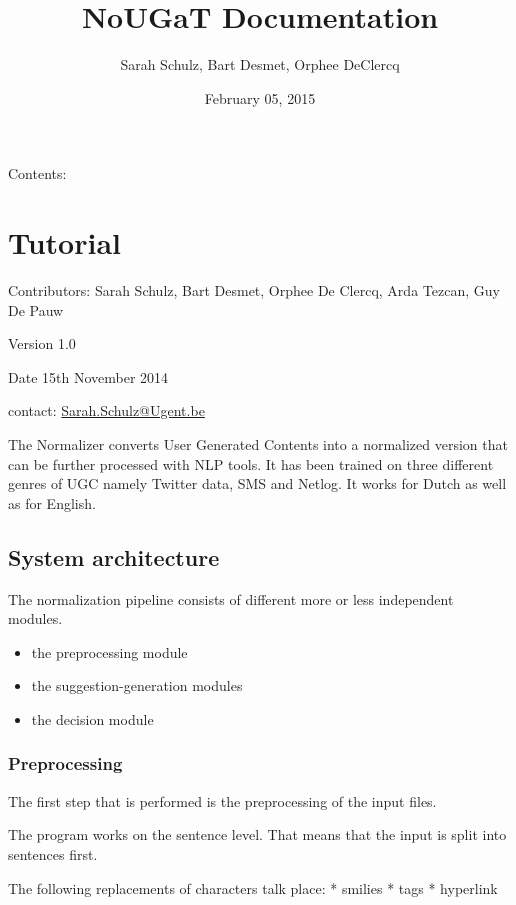 \documentclass[letterpaper,10pt,english]{sphinxmanual}
\title{NoUGaT Documentation}
\date{February 05, 2015}
\author{Sarah Schulz, Bart Desmet, Orphee DeClercq}
\begin{document}
\maketitle
\tableofcontents
{}\label{index::doc}


Contents:


\chapter{Tutorial}
\label{README:welcome-to-nougat-s-documentation}\label{README::doc}\label{README:tutorial}
Contributors: Sarah Schulz, Bart Desmet, Orphee De Clercq, Arda Tezcan, Guy De Pauw

Version 1.0

Date 15th November 2014

contact: \href{mailto:Sarah.Schulz@Ugent.be}{Sarah.Schulz@Ugent.be}

The Normalizer converts User Generated Contents into a normalized version that can be further processed with NLP tools.
It has been trained on three different genres of UGC namely Twitter data, SMS and Netlog. It works for Dutch as well as for English.


\section{System architecture}
\label{README:system-architecture}
The normalization pipeline consists of different more or less independent modules.
\begin{itemize}
\item {} 
the preprocessing module

\item {} 
the suggestion-generation modules

\item {} 
the decision module

\end{itemize}


\subsection{Preprocessing}
\label{README:preprocessing}
The first step that is performed is the preprocessing of the input files.

The program works on the sentence level. That means that the input is split into sentences first.

The following replacements of  characters talk place:
* smilies
* tags
* hyperlink
\end{document}
